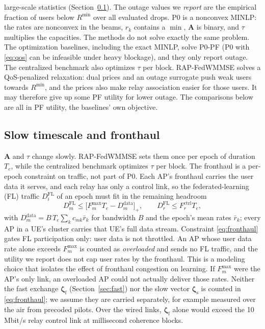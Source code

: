 \documentclass[conference]{IEEEtran}
\newcommand{\zs}{\boldsymbol{\zeta}_{\mathrm{s}}}
\newcommand{\zf}{\boldsymbol{\zeta}_{\mathrm{f}}}
\begin{document}
large-scale statistics (Section~\ref{sec:slow}).
The outage values we \emph{report} are the empirical fraction of users below
$R^{\min}$ over all evaluated drops. P0 is a nonconvex MINLP: the rates are
nonconvex in the beams, $r_k$ contains a $\min$, $\mathbf{A}$ is binary, and
$\tau$ multiplies the capacities. The methods do not solve exactly the same
problem. The optimization baselines, including the exact MINLP, solve
P0-PF (P0 with \eqref{eq:qos} can be infeasible under heavy blockage), and
they only report outage. The centralized benchmark also optimizes $\tau$ per
block. RAP-FedWMMSE
solves a QoS-penalized relaxation: dual prices and an outage surrogate push
weak users towards $R^{\min}$, and the prices also make relay association
easier for those users. It may therefore give up some PF utility for lower
outage. The comparisons below are all in PF utility, the baselines' own
objective.

\subsection{Slow timescale and fronthaul}\label{sec:slow}
$\mathbf{A}$ and $\tau$ change slowly. RAP-FedWMMSE sets them once per epoch
of duration $T_e$, while the centralized benchmark optimizes $\tau$ per block.
The fronthaul is a per-epoch constraint on traffic, not part of P0. Each AP's
fronthaul carries the user data it serves, and each relay has only a control
link, so the federated-learning (FL) traffic $D^{\mathrm{FL}}_i$ of an epoch
must fit in the remaining headroom
\begin{equation}
D^{\mathrm{FL}}_m \le \bigl[F^{\max}_m T_e - D^{\mathrm{data}}_m\bigr]_+,
\qquad
D^{\mathrm{FL}}_r \le F^{\mathrm{ctrl}}_r T_e,
\label{eq:fronthaul}
\end{equation}
with $D^{\mathrm{data}}_m = B\,T_e \sum_k c_{mk}\bar r_k$ for bandwidth $B$
and the epoch's mean rates $\bar r_k$; every AP in a UE's cluster carries
that UE's full data stream. Constraint \eqref{eq:fronthaul} gates FL
participation only: user data is not throttled. An AP whose user data rate
alone exceeds $F^{\max}_m$ is counted as \emph{overloaded} and sends no FL
traffic, and the utility we report does not cap user rates by the fronthaul.
This is a modeling choice that isolates the effect of fronthaul congestion on
learning. If $F^{\max}_m$ were the AP's only link, an overloaded AP could not
actually deliver those rates. Neither the fast exchange $\zf$
(Section~\ref{sec:fast}) nor the slow vector $\zs$ is counted in
\eqref{eq:fronthaul}; we assume they are carried separately, for example
measured over the air from precoded pilots. Over the wired links, $\zf$ alone
would exceed the 10\,Mbit/s relay control link at millisecond coherence
blocks.
\end{document}
